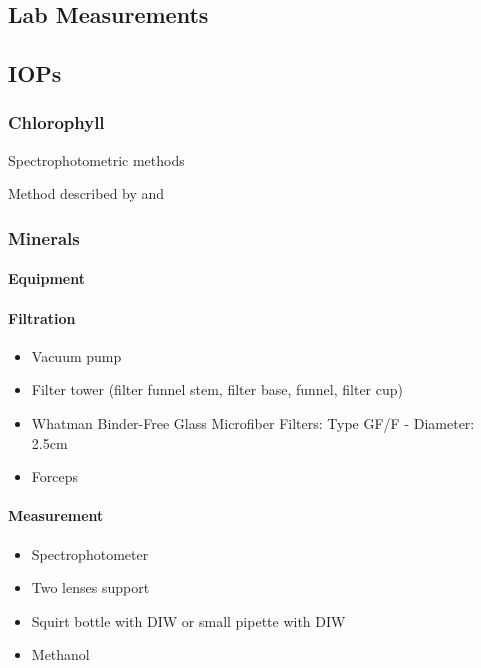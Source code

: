 \begin{appendices}
\chapter{Lab Measurements}
\label{ch:labmea} 
\section{IOPs}
\subsection{Chlorophyll}
Spectrophotometric methods

Method described by \cite{Mitchell2002} and \cite{Cleveland1993}

\subsection{Minerals}

\subsubsection{Equipment}
\subsubsection*{Filtration}
\begin{itemize}
  \item Vacuum pump
  \item Filter tower (filter funnel stem, filter base, funnel, filter cup)
  \item Whatman Binder-Free Glass Microfiber Filters: Type GF/F - Diameter: 2.5cm
  \item Forceps
\end{itemize}
\subsubsection*{Measurement}
\begin{itemize}
  \item Spectrophotometer
  \item {\color{red} Two lenses support}
  \item Squirt bottle with {\color{red} DIW} or small pipette with {\color{red} DIW} 
  \item Methanol
\end{itemize}

\end{appendices}
